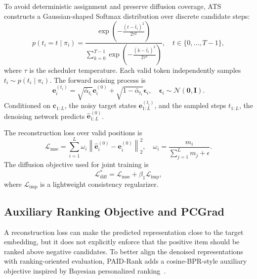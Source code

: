 \documentclass[runningheads,a4paper]{llncs}
\begin{document}
To avoid deterministic assignment and preserve diffusion coverage, ATS constructs a Gaussian-shaped Softmax distribution over discrete candidate steps:
\begin{equation}
    p(t_i=t\mid \pi_i)=
    \frac{\exp\left(-\frac{(t-\bar{t}_i)^2}{2\tau^2}\right)}
    {\sum_{k=0}^{T-1}\exp\left(-\frac{(k-\bar{t}_i)^2}{2\tau^2}\right)},
    \quad t\in\{0,\ldots,T-1\},
    \label{eq:ats_distribution}
\end{equation}
where $\tau$ is the scheduler temperature. Each valid token independently samples $t_i\sim p(t_i\mid\pi_i)$. The forward noising process is
\begin{equation}
    \mathbf{e}^{(t_i)}_i=
    \sqrt{\bar{\alpha}_{t_i}}\mathbf{e}^{(0)}_i+
    \sqrt{1-\bar{\alpha}_{t_i}}\bm{\epsilon}_i,
    \quad \bm{\epsilon}_i\sim\mathcal{N}(\mathbf{0},\mathbf{I}).
    \label{eq:forward_noising}
\end{equation}
Conditioned on $\mathbf{c}_{1:L}$, the noisy target states $\mathbf{e}^{(t_i)}_{1:L}$, and the sampled steps $t_{1:L}$, the denoising network predicts $\hat{\mathbf{e}}^{(0)}_{1:L}$.

The reconstruction loss over valid positions is
\begin{equation}
    \mathcal{L}_{\mathrm{mse}}=
    \sum_{i=1}^{L}\omega_i\left\|\hat{\mathbf{e}}^{(0)}_i-\mathbf{e}^{(0)}_i\right\|_2^2,
    \quad
    \omega_i=\frac{m_i}{\sum_{j=1}^{L}m_j+\epsilon}.
    \label{eq:mse_loss}
\end{equation}
The diffusion objective used for joint training is
\begin{equation}
    \mathcal{L}^{*}_{\mathrm{diff}}=\mathcal{L}_{\mathrm{mse}}+\beta_1\mathcal{L}_{\mathrm{imp}},
    \label{eq:regularized_diff_loss}
\end{equation}
where $\mathcal{L}_{\mathrm{imp}}$ is a lightweight consistency regularizer.

\subsection{Auxiliary Ranking Objective and PCGrad}
\label{subsec:rank_pcgrad}

A reconstruction loss can make the predicted representation close to the target embedding, but it does not explicitly enforce that the positive item should be ranked above negative candidates. To better align the denoised representations with ranking-oriented evaluation, PAID-Rank adds a cosine-BPR-style auxiliary objective inspired by Bayesian personalized ranking~\cite{rendle2009bpr}.
\end{document}
